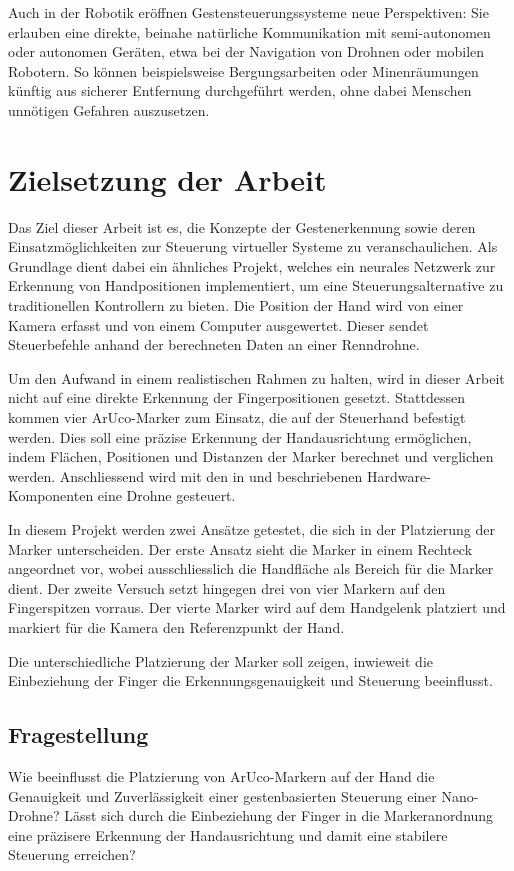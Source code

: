 Auch in der Robotik eröffnen Gestensteuerungssysteme neue Perspektiven: Sie erlauben eine direkte, beinahe natürliche Kommunikation mit semi-autonomen oder autonomen Geräten, etwa bei der Navigation von Drohnen oder mobilen Robotern.
So können beispielsweise Bergungsarbeiten oder Minenräumungen künftig aus sicherer Entfernung durchgeführt werden, ohne dabei Menschen unnötigen Gefahren auszusetzen.

\section{Zielsetzung der Arbeit}
Das Ziel dieser Arbeit ist es, die Konzepte der Gestenerkennung sowie deren Einsatzmöglichkeiten zur Steuerung virtueller Systeme zu veranschaulichen.
Als Grundlage dient dabei ein ähnliches Projekt, welches ein neurales Netzwerk zur Erkennung von Handpositionen implementiert, um eine Steuerungsalternative zu traditionellen Kontrollern zu bieten.
Die Position der Hand wird von einer Kamera erfasst und von einem Computer ausgewertet.
Dieser sendet Steuerbefehle anhand der berechneten Daten an einer Renndrohne.~\cite{arxiv:OmniRace}

Um den Aufwand in einem realistischen Rahmen zu halten, wird in dieser Arbeit nicht auf eine direkte Erkennung der Fingerpositionen gesetzt.
Stattdessen kommen vier ArUco-Marker zum Einsatz, die auf der Steuerhand befestigt werden.
Dies soll eine präzise Erkennung der Handausrichtung ermöglichen, indem Flächen, Positionen und Distanzen der Marker berechnet und verglichen werden.
Anschliessend wird mit den in  und  beschriebenen Hardware-Komponenten eine Drohne gesteuert.

In diesem Projekt werden zwei Ansätze getestet, die sich in der Platzierung der Marker unterscheiden.
Der erste Ansatz sieht die Marker in einem Rechteck angeordnet vor, wobei ausschliesslich die Handfläche als Bereich für die Marker dient.
Der zweite Versuch setzt hingegen drei von vier Markern auf den Fingerspitzen vorraus.
Der vierte Marker wird auf dem Handgelenk platziert und markiert für die Kamera den Referenzpunkt der Hand.

Die unterschiedliche Platzierung der Marker soll zeigen, inwieweit die Einbeziehung der Finger die Erkennungsgenauigkeit und Steuerung beeinflusst.

\subsection{Fragestellung}
Wie beeinflusst die Platzierung von ArUco-Markern auf der Hand die Genauigkeit und Zuverlässigkeit einer gestenbasierten Steuerung einer Nano-Drohne?  
Lässt sich durch die Einbeziehung der Finger in die Markeranordnung eine präzisere Erkennung der Handausrichtung und damit eine stabilere Steuerung erreichen?

